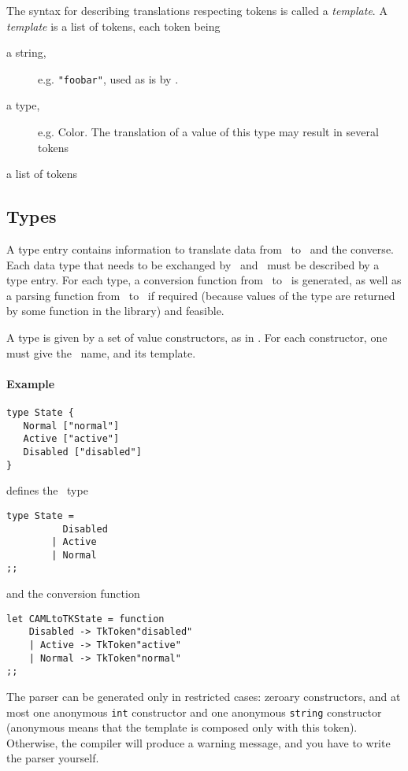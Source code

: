 The syntax for describing translations respecting tokens is called a {\em
template}. A {\em template} is a list of tokens, each token being
\begin{description}
\item[a string,] e.g. \verb|"foobar"|, used as is by \tk.
\item[a type,] e.g. Color. The translation of a value of this type may
result in several tokens
\item[a list of tokens]
\end{description} 

\subsection{Types}
A type entry contains information to translate data from \caml\ to \tk\ 
and the converse. Each data type that needs to be exchanged by \caml\ and
\tk\ must be described by a type entry. For each type, a conversion function
from \caml\ to \tk\ is generated, as well as a parsing function from \tk\ to
\caml\ if required (because values of the type are returned by some
function in the library) and feasible.

A type is given by a set of value constructors, as in \caml. For each
constructor, one must give the \caml\ name, and its template.
\paragraph{Example}
\begin{verbatim}
type State { 
   Normal ["normal"]
   Active ["active"]
   Disabled ["disabled"]
}
\end{verbatim} 
defines the \caml\ type
\begin{verbatim}
type State =
          Disabled
        | Active
        | Normal
;;
\end{verbatim} 
and the conversion function
\begin{verbatim}
let CAMLtoTKState = function
	Disabled -> TkToken"disabled"
	| Active -> TkToken"active"
	| Normal -> TkToken"normal"
;;
\end{verbatim} 

The parser can be generated only in restricted cases: zeroary constructors,
and at most one anonymous \verb|int| constructor and one anonymous
\verb|string| constructor (anonymous means that the template is composed
only with this token). Otherwise, the compiler will produce a warning
message, and you have to write the parser yourself. 

